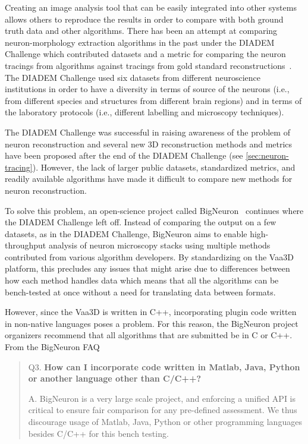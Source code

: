 Creating an image analysis tool that can be easily integrated into
other systems allows others to reproduce the results in order to
compare with both ground truth data and other algorithms. There
has been an attempt at comparing neuron-morphology extraction
algorithms in the past under the \acrshort{DIADEM} Challenge which
contributed datasets and a metric for comparing the neuron
tracings from algorithms against tracings from gold standard
reconstructions~\autocite{DIADEM&Beyond:Liu:2011,DIADEM-dataset:Brown:2011,DIADEM-metric-Gillette2011}.
The DIADEM Challenge used six datasets from different neuroscience
institutions in order to have a diversity in terms of source of
the neurons (i.e., from different species and structures from
different brain regions) and in terms of the laboratory protocols
(i.e., different labelling and microscopy techniques).

The DIADEM Challenge was successful in raising awareness of the
problem of neuron reconstruction and several new 3D reconstruction
methods and metrics have been proposed after the end of the DIADEM
Challenge (see \cref{sec:neuron-tracing}).  However, the
lack of larger public datasets, standardized metrics, and readily
available algorithms have made it difficult to compare new methods
for neuron reconstruction.

To solve this problem, an open-science project called
BigNeuron~\autocite{BigNeuron:Peng:2015,DIADEM2BigNeuron:Peng:2015}
continues where the DIADEM Challenge left off. Instead of
comparing the output on a few datasets, as in the DIADEM Challenge,
BigNeuron aims to enable high-throughput analysis of neuron
microscopy stacks using multiple methods contributed from various
algorithm developers. By standardizing on the Vaa3D platform, this
precludes any issues that might arise due to differences between how each method handles data which
means that all the algorithms can be bench-tested at once without
a need for translating data between formats.

However, since the Vaa3D is written in C++, incorporating plugin
code written in non-native languages poses a problem. For this
reason, the BigNeuron project organizers recommend that all
algorithms that are submitted be in C or C++. From the BigNeuron
FAQ~\autocite{BigNeuron:FAQ:2015}\\
\parbox{\textwidth}{
\begin{quote}
	\begin{fancyquote}
		{Q3. \bfseries How can I incorporate code written in Matlab, Java, Python or another language other than C/C++?}

		A. BigNeuron is a very large scale project, and enforcing a
		unified API is critical to ensure fair comparison for any pre-defined
		assessment. We thus discourage usage of Matlab, Java, Python or other
		programming languages besides C/C++ for this bench
		testing.
	\end{fancyquote}
\end{quote}
}

